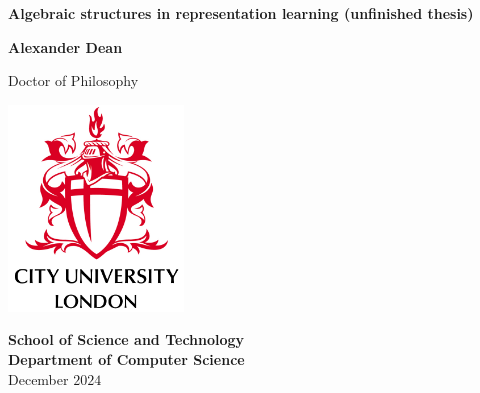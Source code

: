 \begin{titlepage}
\thispagestyle{empty}
\begin{fullwidth}
    \begin{center}
        \vspace*{2mm}
        
        \begin{spacing}{1.2}
        \Huge
        \textbf{Algebraic structures in representation learning (unfinished thesis)}
 		\end{spacing}
        
        \vspace{1cm}
        \Large
        \textbf{Alexander Dean}

        \vspace{1.5cm}
        
        \begin{spacing}{1}
        Doctor of Philosophy\\
        \end{spacing}
        
        \vspace{2cm} 
		
	    \includegraphics[width=0.35\textwidth]{Frontmatter/Images/CU_logo_S1.PNG}
	    
	    \vspace{1cm}

		\textbf{School of Science and Technology}\\
        \textbf{Department of Computer Science}\\
        
        \vfill
        December $2024$
        
    \end{center}
\end{fullwidth}
\end{titlepage}